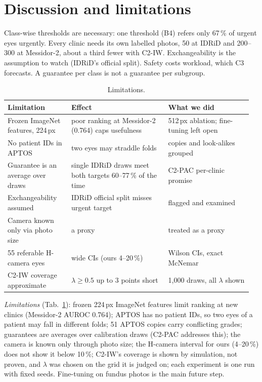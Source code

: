 \documentclass[10pt,twocolumn,letterpaper]{article}
\newcommand{\pct}{\,\%}
\begin{document}
\section{Discussion and limitations}
Class-wise thresholds are necessary: one threshold (B4) refers only 67\pct{} of urgent eyes urgently. Every clinic needs its own labelled photos, 50 at IDRiD and 200--300 at Messidor-2, about a third fewer with C2-IW. Exchangeability is the assumption to watch (IDRiD's official split). Safety costs workload, which C3 forecasts. A guarantee per class is not a guarantee per subgroup. \begin{table}[t]\centering\small
\begin{tabular}{@{}p{0.25\linewidth}p{0.38\linewidth}p{0.33\linewidth}@{}}\toprule
Limitation & Effect & What we did\\\midrule
Frozen ImageNet features, 224\,px & poor ranking at Messidor-2 (0.764) caps usefulness & 512\,px ablation; fine-tuning left open\\
No patient IDs in APTOS & two eyes may straddle folds & copies and look-alikes grouped\\
Guarantee is an average over draws & single IDRiD draws meet both targets 60--77\pct{} of the time & C2-PAC per-clinic promise\\
Exchangeability assumed & IDRiD official split misses urgent target & flagged and examined\\
Camera known only via photo size & a proxy & treated as a proxy\\
55 referable H-camera eyes & wide CIs (ours 4--20\pct) & Wilson CIs, exact McNemar\\
C2-IW coverage approximate & $\lambda\ge0.5$ up to 3 points short & 1,000 draws, all $\lambda$ shown\\\bottomrule
\end{tabular}
\caption{Limitations.}\label{tab:lim}
\end{table}
\emph{Limitations} (Tab.~\ref{tab:lim}): frozen 224\,px ImageNet features limit ranking at new clinics (Messidor-2 AUROC 0.764); APTOS has no patient IDs, so two eyes of a patient may fall in different folds; 51 APTOS copies carry conflicting grades; guarantees are averages over calibration draws (C2-PAC addresses this); the camera is known only through photo size; the H-camera interval for ours (4--20\pct) does not show it below 10\pct; C2-IW's coverage is shown by simulation, not proven, and $\lambda$ was chosen on the grid it is judged on; each experiment is one run with fixed seeds. Fine-tuning on fundus photos is the main future step.
\end{document}
